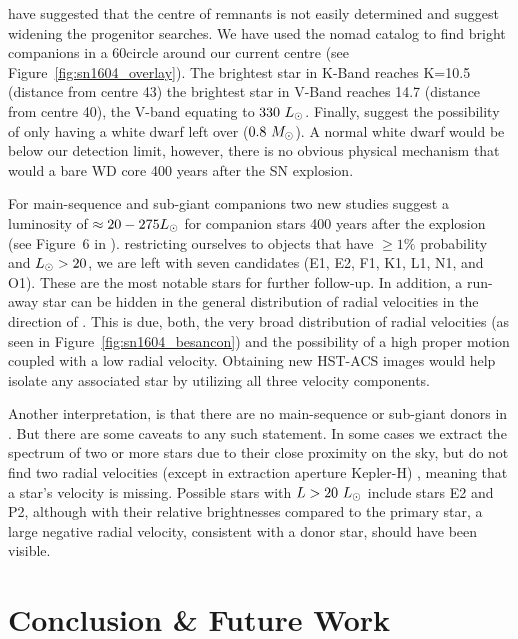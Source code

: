 \documentclass[preprint2]{aastex}
\begin{document}
\cite{2013arXiv1305.0567W} have suggested that the centre of remnants is not easily determined and suggest widening the progenitor searches. We have used the \gls{nomad} catalog to find bright companions in a 60\arcsec circle around our current centre (see Figure~\ref{fig:sn1604_overlay}). The brightest star in K-Band reaches K=10.5 (distance from centre 43\arcsec)  the brightest star in V-Band reaches 14.7 (distance from centre 40\arcsec), the V-band equating to $330~\hbox{$L_{\odot}$}$.   Finally, \citet{2012A&A...537A.139C}  suggest the possibility of only having a white dwarf left over ($0.8~\hbox{$M_{\odot}$}$).  A normal white dwarf would be below our detection limit, however, there is no obvious physical mechanism that would a bare WD core 400 years after the SN explosion.

For main-sequence and sub-giant companions two new studies  \citep{2012arXiv1205.5028S,2012ApJ...760...21P} suggest a luminosity of $\approx 20 - 275 \hbox{$L_{\odot}$}$ for companion stars 400 years after the explosion (see Figure~6 in \citep{2012ApJ...760...21P}). restricting ourselves to objects that have $\ge 1 \%$ probability and $\hbox{$L_{\odot}$} > 20$, we are left with seven candidates (E1, E2, F1, K1, L1, N1, and O1). These are the most notable stars for further follow-up. In addition, a run-away star can be hidden in the general distribution of radial velocities in the direction of . This is due, both, the very broad distribution of radial velocities (as seen in Figure~\ref{fig:sn1604_besancon}) and the possibility of a high proper motion coupled with a low radial velocity. Obtaining new HST-ACS images would help isolate any associated star by utilizing all three velocity components. 

Another interpretation, is that there are no main-sequence or sub-giant donors in . But there are some caveats to any such statement.  In some cases we extract the spectrum of two or more stars due to their close proximity on the sky, but do not find two radial velocities (except in extraction aperture Kepler-H) , meaning that a star's velocity is missing. Possible stars with $L>20~\hbox{$L_{\odot}$}$ include stars E2 and P2, although with their relative brightnesses compared to the primary star, a large negative radial velocity, consistent with a donor star, should have been visible.
 






\section{Conclusion \& Future Work}
\end{document}
